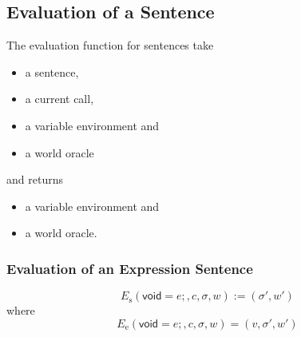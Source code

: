 \documentclass{book}
\newcommand{\evalE}[1]{E_\mathrm{e}\left({#1}\right)}
\newcommand{\evalS}[1]{E_\mathrm{s}\left({#1}\right)}
\newcommand{\expressionsentence}[1]{\mathsf{void}={#1}\mathsf{;}}
\begin{document}
\subsection{Evaluation of a Sentence}

The evaluation function for sentences take
\begin{itemize}
\item a sentence,
\item a current call,
\item a variable environment and
\item a world oracle
\end{itemize}
and returns
\begin{itemize}
\item a variable environment and
\item a world oracle.
\end{itemize}

\subsubsection{Evaluation of an Expression Sentence}

\[
\evalS{\boxed{\expressionsentence{e}}, c, \sigma, w} := (\sigma', w')
\]
where
\[
\evalE{\boxed{\expressionsentence{e}}, c, \sigma, w} = (v, \sigma', w')
\]
\end{document}
